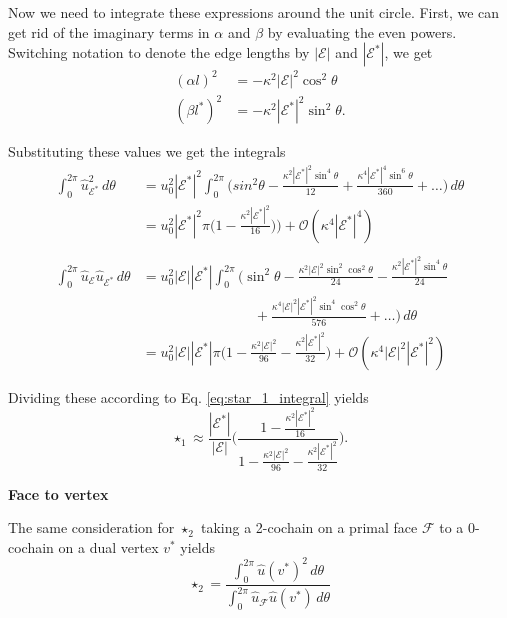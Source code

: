 \documentclass[utf8,english]{gradu3}
\begin{document}
Now we need to integrate these expressions around the unit circle.
First, we can get rid of the imaginary terms in $\alpha$ and $\beta$
by evaluating the even powers.
Switching notation to denote the edge lengths
by $|\mathcal{E}|$ and $|\mathcal{E}^*|$, we get
\begin{align*}
  (\alpha l)^2 &= -\kappa^2 |\mathcal{E}|^2 \cos^2 \theta \\
  (\beta l^*)^2 &= -\kappa^2 |\mathcal{E}^*|^2 \sin^2 \theta.
\end{align*}

Substituting these values we get the integrals
\begin{align*}
\int_{0}^{2\pi} \hat{u}_{\mathcal{E}^*}^2 \,d\theta
&= u_0^2 |\mathcal{E}^*|^2 \int_{0}^{2\pi}
\Big( sin^2\theta - \frac{\kappa^2 |\mathcal{E}^*|^2 \sin^4\theta}{12}
+ \frac{\kappa^4 |\mathcal{E}^*|^4 \sin^6\theta}{360} + \dots \Big) \,d\theta \\
&= u_0^2 |\mathcal{E}^*|^2 \pi \Big(
1 - \frac{\kappa^2 |\mathcal{E}^*|^2}{16}) \Big)
+ \mathcal{O}(\kappa^4 |\mathcal{E}^*|^4)\\
\\
\int_{0}^{2\pi} \hat{u}_{\mathcal{E}} \hat{u}_{\mathcal{E}^*} \,d\theta
&= u_0^2 |\mathcal{E}| |\mathcal{E}^*| \int_{0}^{2\pi}
\Big( \sin^2\theta - \frac{\kappa^2 |\mathcal{E}|^2 \sin^2\cos^2\theta}{24}
- \frac{\kappa^2 |\mathcal{E}^*|^2 \sin^4\theta}{24} \\
&\qquad\qquad\qquad\qquad + \frac{\kappa^4 |\mathcal{E}|^2 |\mathcal{E}^*|^2
  \sin^4\cos^2\theta}{576} + \dots \Big) \,d\theta \\
&= u_0^2 |\mathcal{E}| |\mathcal{E}^*| \pi \Big(
1 - \frac{\kappa^2 |\mathcal{E}|^2}{96} - \frac{\kappa^2 |\mathcal{E}^*|^2}{32} \Big)
+ \mathcal{O}(\kappa^4 |\mathcal{E}|^2 |\mathcal{E}^*|^2)
\end{align*}

Dividing these according to Eq. \eqref{eq:star_1_integral} yields
\begin{equation}\label{eq:harmonic_hodge_1}
  \star_1 \approx \frac{|\mathcal{E}^*|}{|\mathcal{E}|}
  \Big( \frac{1 - \frac{\kappa^2 |\mathcal{E}^*|^2}{16}}
  { 1 - \frac{\kappa^2 |\mathcal{E}|^2}{96} - \frac{\kappa^2 |\mathcal{E}^*|^2}{32} } \Big).
\end{equation}

\textbf{Face to vertex}

The same consideration for $\star_2$ taking a 2-cochain
on a primal face $\mathcal{F}$ to a 0-cochain 
on a dual vertex $v^*$ yields
\begin{equation}\label{eq:star_2_integral}
  \star_2 = \frac{\int_0^{2\pi} \hat{u}(v^*)^2 \,d\theta}
  {\int_0^{2\pi} \hat{u}_{\mathcal{F}} \hat{u}(v^*) \,d\theta}
\end{equation}
\end{document}
